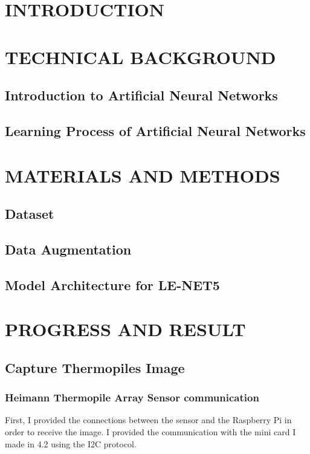 \documentclass[thesis]{deutez}
\begin{document}
\begin{abstract}
		
\end{abstract}

\begin{ozet}
	
\end{ozet}
 
\tableofcontents
\listoftables
\listoffigures

\start

\chapter{INTRODUCTION}

\chapter{TECHNICAL BACKGROUND}

\section{Introduction to Artificial Neural Networks}
\section{Learning Process of Artificial Neural Networks}

\chapter{MATERIALS AND METHODS}
\section{Dataset}
\section{Data Augmentation}
\section{Model Architecture for LE-NET5}
\chapter{PROGRESS AND RESULT}
\section{Capture Thermopiles Image}
\subsection{Heimann Thermopile Array Sensor communication}
First, I provided the connections between the sensor and the Raspberry Pi in order to receive the image. I provided the communication with the mini card I made in 4.2 using the I2C protocol.
\end{document}

